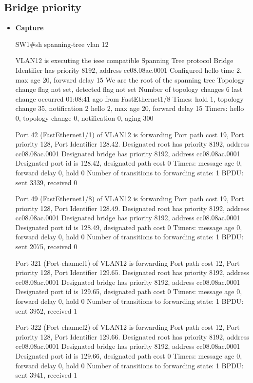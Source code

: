 \documentclass[10pt]{article}
\begin{document}
\subsection{Bridge priority}
\begin{itemize}
\item {\bf Capture}
\begin{verbatim*}
SW1#sh spanning-tree vlan 12

VLAN12 is executing the ieee compatible Spanning Tree protocol
Bridge Identifier has priority 8192, address cc08.08ac.0001
Configured hello time 2, max age 20, forward delay 15
We are the root of the spanning tree
Topology change flag not set, detected flag not set
Number of topology changes 6 last change occurred 01:08:41 ago
from FastEthernet1/8
Times:  hold 1, topology change 35, notification 2
hello 2, max age 20, forward delay 15
Timers: hello 0, topology change 0, notification 0, aging 300

Port 42 (FastEthernet1/1) of VLAN12 is forwarding
Port path cost 19, Port priority 128, Port Identifier 128.42.
Designated root has priority 8192, address cc08.08ac.0001
Designated bridge has priority 8192, address cc08.08ac.0001
Designated port id is 128.42, designated path cost 0
Timers: message age 0, forward delay 0, hold 0
Number of transitions to forwarding state: 1
BPDU: sent 3339, received 0

Port 49 (FastEthernet1/8) of VLAN12 is forwarding
Port path cost 19, Port priority 128, Port Identifier 128.49.
Designated root has priority 8192, address cc08.08ac.0001
Designated bridge has priority 8192, address cc08.08ac.0001
Designated port id is 128.49, designated path cost 0
Timers: message age 0, forward delay 0, hold 0
Number of transitions to forwarding state: 1
BPDU: sent 2075, received 0

Port 321 (Port-channel1) of VLAN12 is forwarding
Port path cost 12, Port priority 128, Port Identifier 129.65.
Designated root has priority 8192, address cc08.08ac.0001
Designated bridge has priority 8192, address cc08.08ac.0001
Designated port id is 129.65, designated path cost 0
Timers: message age 0, forward delay 0, hold 0
Number of transitions to forwarding state: 1
BPDU: sent 3952, received 1

Port 322 (Port-channel2) of VLAN12 is forwarding
Port path cost 12, Port priority 128, Port Identifier 129.66.
Designated root has priority 8192, address cc08.08ac.0001
Designated bridge has priority 8192, address cc08.08ac.0001
Designated port id is 129.66, designated path cost 0
Timers: message age 0, forward delay 0, hold 0
Number of transitions to forwarding state: 1
BPDU: sent 3941, received 1



\end{verbatim*}
\end{itemize}
\end{document}
